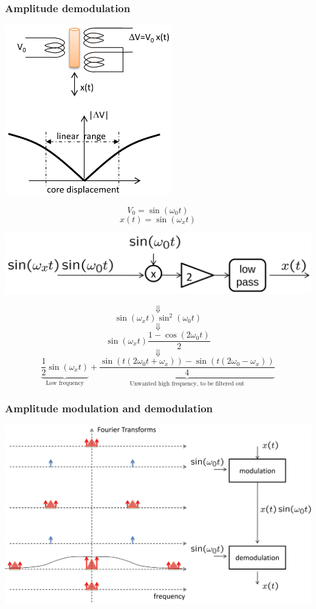 \documentclass[11pt]{article}
\begin{document}
\subsubsection{Amplitude demodulation}
\label{sec:org9827c3b}
\begin{center}
\includegraphics[height=20em]{./images/amplitude-demodulation-diagram-and-graph.png}
\end{center}
\[V_0 = \sin (\omega_0 t)\]
\[x (t) = \sin (\omega_x t)\]

\begin{center}
\includegraphics[width=.9\linewidth]{./images/amplitude-demodulation-first-step.png}
\end{center}
\[\Downarrow\]
\[\sin(\omega_x t) \sin^2 (\omega_0 t)\]
\[\Downarrow\]
\[\sin(\omega_x t) \frac{1 - \cos(2 \omega_0 t)}{2}\]
\[\Downarrow\]
\[\underbrace{\frac{1}{2} \sin(\omega_x t)}_{\text{Low frequency}} + \underbrace{\frac{\sin (t(2 \omega_0 t + \omega_x)) - \sin (t(2 \omega_0 - \omega_x))}{4}}_{\text{Unwanted high frequency, to be filtered out}}\]
\subsubsection{Amplitude modulation and demodulation}
\label{sec:orga3ce2d7}
\begin{center}
\includegraphics[width=.9\linewidth]{./images/amplitude-modulation-and-demodulation-process.png}
\end{center}
\end{document}
